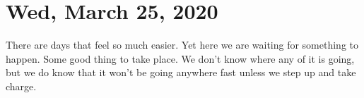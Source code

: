 \section{Wed, March 25, 2020}
There are days that feel so much easier. Yet here we are waiting for something
to happen. Some good thing to take place. We don't know where any of it is 
going, but we do know that it won't be going anywhere fast unless we step up
and take charge.